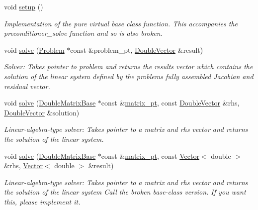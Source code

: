 \begin{DoxyCompactItemize}
void \hyperlink{classoomph_1_1HelmholtzGMRESMG_ae566e34da6aa9ca70a034f7ef93a1aa5}{setup} ()
\begin{DoxyCompactList}\small\item\em Implementation of the pure virtual base class function. This accompanies the preconditioner\+\_\+solve function and so is also broken. \end{DoxyCompactList}\item 
void \hyperlink{classoomph_1_1HelmholtzGMRESMG_a5806236b991ac2d7fe4bc7a4f19e98fb}{solve} (\hyperlink{classoomph_1_1Problem}{Problem} $\ast$const \&problem\+\_\+pt, \hyperlink{classoomph_1_1DoubleVector}{Double\+Vector} \&result)
\begin{DoxyCompactList}\small\item\em Solver\+: Takes pointer to problem and returns the results vector which contains the solution of the linear system defined by the problem\textquotesingle{}s fully assembled Jacobian and residual vector. \end{DoxyCompactList}\item 
void \hyperlink{classoomph_1_1HelmholtzGMRESMG_a3e6405af2506c7b789ba3208d0a9cf6d}{solve} (\hyperlink{classoomph_1_1DoubleMatrixBase}{Double\+Matrix\+Base} $\ast$const \&\hyperlink{classoomph_1_1BlockPreconditioner_a9aac48fd53e579e6db8eeed58933a14b}{matrix\+\_\+pt}, const \hyperlink{classoomph_1_1DoubleVector}{Double\+Vector} \&rhs, \hyperlink{classoomph_1_1DoubleVector}{Double\+Vector} \&solution)
\begin{DoxyCompactList}\small\item\em Linear-\/algebra-\/type solver\+: Takes pointer to a matrix and rhs vector and returns the solution of the linear system. \end{DoxyCompactList}\item 
void \hyperlink{classoomph_1_1HelmholtzGMRESMG_a14ba0370fbc782fa7ab9364a035a7513}{solve} (\hyperlink{classoomph_1_1DoubleMatrixBase}{Double\+Matrix\+Base} $\ast$const \&\hyperlink{classoomph_1_1BlockPreconditioner_a9aac48fd53e579e6db8eeed58933a14b}{matrix\+\_\+pt}, const \hyperlink{classoomph_1_1Vector}{Vector}$<$ double $>$ \&rhs, \hyperlink{classoomph_1_1Vector}{Vector}$<$ double $>$ \&result)
\begin{DoxyCompactList}\small\item\em Linear-\/algebra-\/type solver\+: Takes pointer to a matrix and rhs vector and returns the solution of the linear system Call the broken base-\/class version. If you want this, please implement it. \end{DoxyCompactList}\item 

\end{DoxyCompactItemize}
